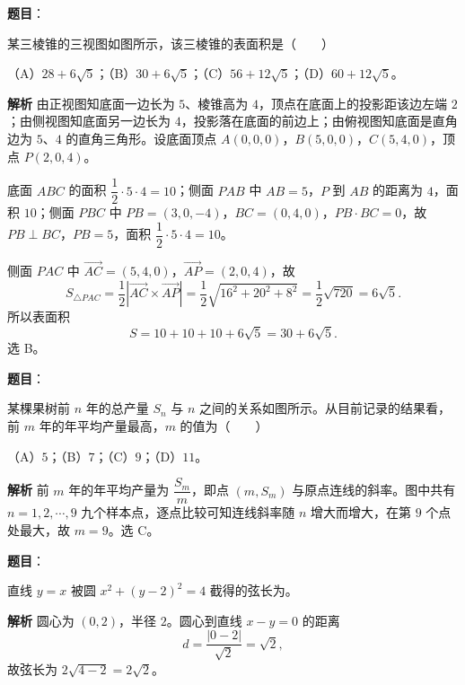 \begin{answer}

\textbf{题目}：

某三棱锥的三视图如图所示，该三棱锥的表面积是\mbox{（　　）}
\nopagebreak[4]
\begin{center}\end{center}
\nopagebreak[4]
（A）$28+6\sqrt5$；（B）$30+6\sqrt5$；（C）$56+12\sqrt5$；（D）$60+12\sqrt5$。

\textbf{解析}
由正视图知底面一边长为 $5$、棱锥高为 $4$，顶点在底面上的投影距该边左端 $2$；由侧视图知底面另一边长为 $4$，投影落在底面的前边上；由俯视图知底面是直角边为 $5$、$4$ 的直角三角形。设底面顶点 $A(0,0,0)$，$B(5,0,0)$，$C(5,4,0)$，顶点 $P(2,0,4)$。

底面 $ABC$ 的面积 $\dfrac12\cdot5\cdot4=10$；侧面 $PAB$ 中 $AB=5$，$P$ 到 $AB$ 的距离为 $4$，面积 $10$；侧面 $PBC$ 中 $PB=(3,0,-4)$，$BC=(0,4,0)$，$PB\cdot BC=0$，故 $PB\perp BC$，$PB=5$，面积 $\dfrac12\cdot5\cdot4=10$。

侧面 $PAC$ 中 $\overrightarrow{AC}=(5,4,0)$，$\overrightarrow{AP}=(2,0,4)$，故
\nopagebreak[4]
\[S_{\triangle PAC}=\frac12\left|\overrightarrow{AC}\times\overrightarrow{AP}\right|=\frac12\sqrt{16^2+20^2+8^2}=\frac12\sqrt{720}=6\sqrt5.\]
所以表面积
\nopagebreak[4]
\[S=10+10+10+6\sqrt5=30+6\sqrt5.\]
选 B。


\end{answer}
\begin{answer}

\textbf{题目}：

某棵果树前 $n$ 年的总产量 $S_n$ 与 $n$ 之间的关系如图所示。从目前记录的结果看，前 $m$ 年的年平均产量最高，$m$ 的值为\mbox{（　　）}
\nopagebreak[4]
\begin{center}\end{center}
\nopagebreak[4]
（A）$5$；（B）$7$；（C）$9$；（D）$11$。

\textbf{解析}
前 $m$ 年的年平均产量为 $\dfrac{S_m}m$，即点 $(m,S_m)$ 与原点连线的斜率。图中共有 $n=1,2,\cdots,9$ 九个样本点，逐点比较可知连线斜率随 $n$ 增大而增大，在第 $9$ 个点处最大，故 $m=9$。选 C。


\end{answer}
\begin{answer}

\textbf{题目}：

直线 $y=x$ 被圆 $x^2+(y-2)^2=4$ 截得的弦长为\gkblank{}。

\textbf{解析}
圆心为 $(0,2)$，半径 $2$。圆心到直线 $x-y=0$ 的距离
\nopagebreak[4]
\[d=\frac{|0-2|}{\sqrt2}=\sqrt2,\]
故弦长为 $2\sqrt{4-2}=2\sqrt2$。


\end{answer}
